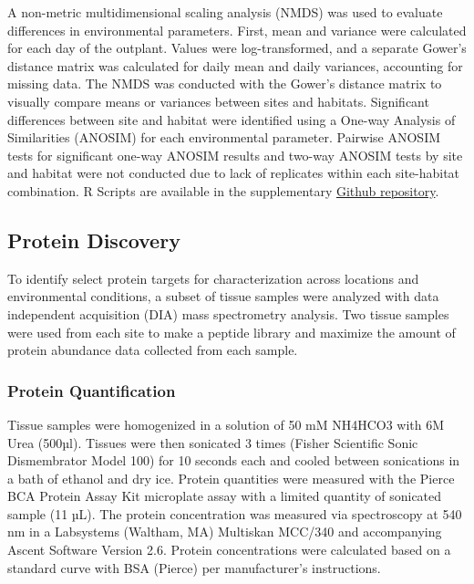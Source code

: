 \documentclass [11pt, proquest] {uwthesis}[2015/03/03]
\begin{document}
A non-metric multidimensional scaling analysis (NMDS) was used to evaluate differences in environmental parameters. First, mean and variance were calculated for each day of the outplant. Values were log-transformed, and a separate Gower's distance matrix was calculated for daily mean and daily variances, accounting for missing data. The NMDS was conducted with the Gower's distance matrix to visually compare means or variances between sites and habitats. Significant differences between site and habitat were identified using a One-way Analysis of Similarities (ANOSIM) for each environmental parameter. Pairwise ANOSIM tests for significant one-way ANOSIM results and two-way ANOSIM tests by site and habitat were not conducted due to lack of replicates within each site-habitat combination. R Scripts are available in the supplementary \href{https://github.com/RobertsLab/paper-gigas-DNR-proteomics}{Github repository}.

\hypertarget{protein-discovery}{%
\subsection{Protein Discovery}\label{protein-discovery}}

To identify select protein targets for characterization across locations and environmental conditions, a subset of tissue samples were analyzed with data independent acquisition (DIA) mass spectrometry analysis. Two tissue samples were used from each site to make a peptide library and maximize the amount of protein abundance data collected from each sample.

\hypertarget{protein-quantification}{%
\subsubsection{Protein Quantification}\label{protein-quantification}}

Tissue samples were homogenized in a solution of 50 mM NH4HCO3 with 6M Urea (500µl). Tissues were then sonicated 3 times (Fisher Scientific Sonic Dismembrator Model 100) for 10 seconds each and cooled between sonications in a bath of ethanol and dry ice. Protein quantities were measured with the Pierce BCA Protein Assay Kit microplate assay with a limited quantity of sonicated sample (11 µL). The protein concentration was measured via spectroscopy at 540 nm in a Labsystems (Waltham, MA) Multiskan MCC/340 and accompanying Ascent Software Version 2.6. Protein concentrations were calculated based on a standard curve with BSA (Pierce) per manufacturer's instructions.
\end{document}
